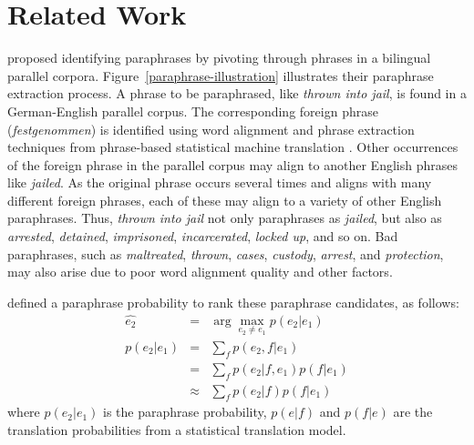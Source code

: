 \documentclass[11pt]{article}
\begin{document}
\section{Related Work}

  proposed identifying paraphrases by pivoting through phrases in a bilingual parallel corpora. 
Figure~\ref{paraphrase-illustration} illustrates their paraphrase extraction process. A phrase to be paraphrased, like {\it thrown into jail}, is found in a German-English parallel corpus.  The corresponding foreign phrase ({\it festgenommen}) is identified using word alignment and phrase extraction techniques from phrase-based statistical machine translation \cite{KoehnEtAl03}.  Other occurrences of the foreign phrase in the parallel corpus may align to another English phrases like {\it jailed}.  %
%
As the original phrase occurs several times and aligns with many different foreign phrases, each of these may align to a variety of other English paraphrases.  Thus, {\it thrown into jail} not only paraphrases as {\it jailed}, but also as {\it arrested}, {\it detained}, {\it imprisoned}, {\it incarcerated}, {\it locked up}, and so on.
Bad paraphrases, such as
 {\it maltreated}, {\it thrown}, {\it cases}, {\it custody}, {\it arrest}, and {\it protection}, may also arise due to poor word alignment quality and other factors.

 defined a paraphrase probability to rank these paraphrase candidates,  as follows:
\begin{eqnarray} \label{paraphrase-prob-1}
 \hat{e_2}	& = & \arg \max_{e_2 \neq e_1} p(e_2 | e_1)\label{paraphrase-prob}  \\
  p(e_2|e_1) &=& \sum_f p(e_2,f|e_1)\\
                  &=& \sum_f p(e_2|f,e_1) p(f|e_1) \\
                  &\approx& \sum_f p(e_2|f) p(f|e_1)
\label{paraphrase_prob_eqn}
\end{eqnarray}
where ${p(e_2|e_1)}$ is the paraphrase probability, ${p(e|f)}$ and ${p(f|e)}$ are the translation probabilities from a statistical translation model.  
\end{document}
